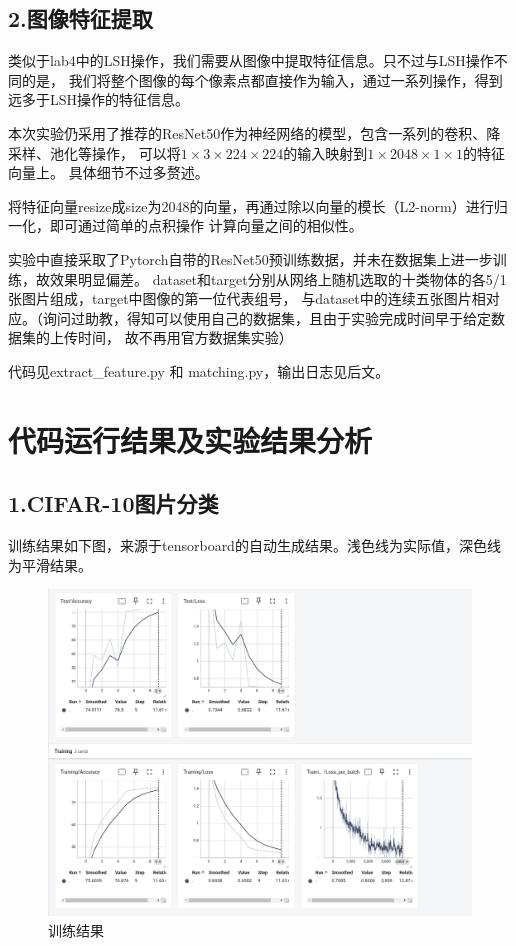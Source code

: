 \documentclass{article}
\begin{document}
\subsection{2.图像特征提取}

    类似于lab4中的LSH操作，我们需要从图像中提取特征信息。只不过与LSH操作不同的是，
    我们将整个图像的每个像素点都直接作为输入，通过一系列操作，得到远多于LSH操作的特征信息。

    本次实验仍采用了推荐的ResNet50作为神经网络的模型，包含一系列的卷积、降采样、池化等操作，
    可以将\(1 \times 3 \times 224 \times 224\)的输入映射到\(1 \times 2048 \times 1 \times 1\)的特征向量上。
    具体细节不过多赘述。

    将特征向量resize成size为2048的向量，再通过除以向量的模长（L2-norm）进行归一化，即可通过简单的点积操作
    计算向量之间的相似性。

    实验中直接采取了Pytorch自带的ResNet50预训练数据，并未在数据集上进一步训练，故效果明显偏差。
    dataset和target分别从网络上随机选取的十类物体的各5/1张图片组成，target中图像的第一位代表组号，
    与dataset中的连续五张图片相对应。（询问过助教，得知可以使用自己的数据集，且由于实验完成时间早于给定数据集的上传时间，
    故不再用官方数据集实验）

    代码见extract_feature.py 和 matching.py，输出日志见后文。

\section{代码运行结果及实验结果分析}

\subsection{1.CIFAR-10图片分类}

    训练结果如下图，来源于tensorboard的自动生成结果。浅色线为实际值，深色线为平滑结果。

\newpage

\begin{figure}[h]
\centering
\includegraphics[width=1\textwidth]{./Pytorch/res}
\caption{训练结果}
\end{figure}
\end{document}
